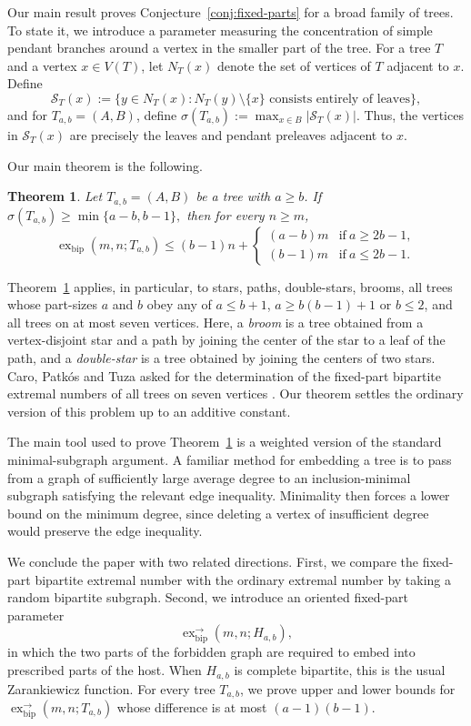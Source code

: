 \documentclass[10pt,a4paper]{amsart}
\newtheorem{theorem}{Theorem}[section]
\newcommand{\exbip}{\operatorname{ex}_{\mathrm{bip}}}
\newcommand{\exor}{\operatorname{ex}^{\rightarrow}_{\mathrm{bip}}}
\begin{document}
Our main result proves Conjecture~\ref{conj:fixed-parts} for a broad family of trees. To state it, we introduce a parameter measuring the concentration of simple pendant branches around a vertex in the smaller part of the tree. For a tree $T$ and a vertex $x\in V(T)$, let $N_T(x)$ denote the set of vertices  of $T$ adjacent to $x$. Define
\[
    \mathcal S_T(x):=\{y\in N_T(x):N_T(y)\setminus\{x\}\text{ consists entirely of leaves}\},
\]
and for $T_{a,b}=(A,B)$, define $\sigma(T_{a,b}):=\max_{x\in B}|\mathcal S_T(x)|$.  Thus, the vertices in $\mathcal S_T(x)$ are precisely the leaves and pendant preleaves adjacent to $x$.

Our main theorem is the following.


\begin{theorem}\label{thm:main}
Let $T_{a,b}=(A,B)$ be a tree with $a\ge b$. If $\sigma(T_{a,b})\ge \min\{a-b,b-1\},$ then for every $n\geq m$,
\[
    \exbip(m,n;T_{a,b})\le(b-1)n+\begin{cases}
    (a-b)m&\text{if}\ a\geq2b-1,\\
    (b-1)m&\text{if}\ a\leq2b-1.
    \end{cases}
\]
\end{theorem}


Theorem~\ref{thm:main} applies, in particular, to stars, paths, double-stars, brooms, all trees whose part-sizes $a$ and $b$ obey any of $a\leq b+1$, $a\geq b(b-1)+1$ or $b\leq 2$, and all trees on at most seven vertices. Here, a \emph{broom} is a tree obtained from a vertex-disjoint star and a path by joining the center of the star to a leaf of the path, and a \emph{double-star} is a tree obtained by joining the centers of two stars. Caro, Patk\'os and Tuza asked for the determination of the fixed-part bipartite extremal numbers of all trees on seven vertices \cite{caro2025}. Our theorem settles the ordinary version of this problem up to an additive constant.

The main tool used to prove Theorem~\ref{thm:main} is a weighted version of the standard minimal-subgraph argument. A familiar method for embedding a tree is to pass from a graph of sufficiently large average degree to an inclusion-minimal subgraph satisfying the relevant edge inequality. Minimality then forces a lower bound on the minimum degree, since deleting a vertex of insufficient degree would preserve the edge inequality.

We conclude the paper with two related directions. First, we compare the fixed-part bipartite extremal number with the ordinary extremal number by taking a random bipartite subgraph. Second, we introduce an oriented fixed-part parameter
\[
\exor(m,n;H_{a,b}),
\]
in which the two parts of the forbidden graph are required to embed into prescribed parts of the host. When $H_{a,b}$ is complete bipartite, this is the usual Zarankiewicz function. For every tree $T_{a,b}$, we prove upper and lower bounds for $\exor(m,n;T_{a,b})$ whose difference is at most $(a-1)(b-1)$.
\end{document}
